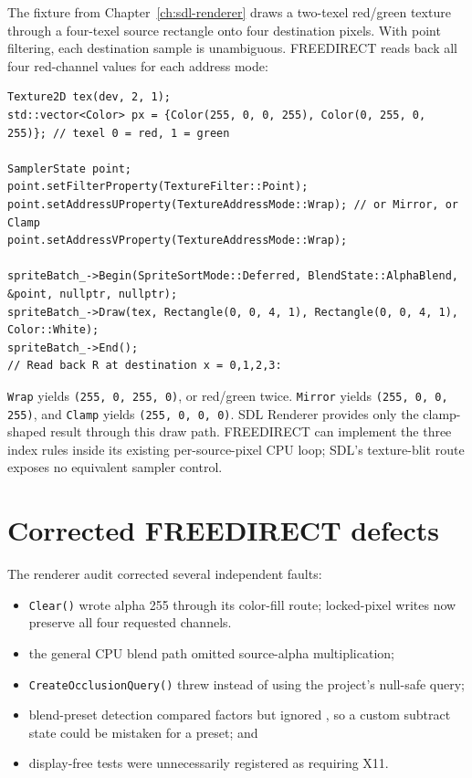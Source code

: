 The fixture from Chapter~\ref{ch:sdl-renderer} draws a two-texel red/green texture through a
four-texel source rectangle onto four destination pixels. With point filtering, each destination
sample is unambiguous. FREEDIRECT reads back all four red-channel values for each address mode:

\begin{lstlisting}
Texture2D tex(dev, 2, 1);
std::vector<Color> px = {Color(255, 0, 0, 255), Color(0, 255, 0, 255)}; // texel 0 = red, 1 = green

SamplerState point;
point.setFilterProperty(TextureFilter::Point);
point.setAddressUProperty(TextureAddressMode::Wrap); // or Mirror, or Clamp
point.setAddressVProperty(TextureAddressMode::Wrap);

spriteBatch_->Begin(SpriteSortMode::Deferred, BlendState::AlphaBlend, &point, nullptr, nullptr);
spriteBatch_->Draw(tex, Rectangle(0, 0, 4, 1), Rectangle(0, 0, 4, 1), Color::White);
spriteBatch_->End();
// Read back R at destination x = 0,1,2,3:
\end{lstlisting}

\texttt{Wrap} yields \texttt{(255, 0, 255, 0)}, or red/green twice. \texttt{Mirror} yields
\texttt{(255, 0, 0, 255)}, and \texttt{Clamp} yields \texttt{(255, 0, 0, 0)}. SDL Renderer
provides only the clamp-shaped result through this draw path. FREEDIRECT can implement the three
index rules inside its existing per-source-pixel CPU loop; SDL's texture-blit route exposes no
equivalent sampler control.

\section{Corrected FREEDIRECT defects}

The renderer audit corrected several independent faults:

\begin{itemize}
  \item \texttt{Clear()} wrote alpha 255 through its color-fill route; locked-pixel writes now
        preserve all four requested channels.
  \item the general CPU blend path omitted source-alpha multiplication;
  \item \texttt{CreateOcclusionQuery()} threw instead of using the project's null-safe query;
  \item blend-preset detection compared factors but ignored , so a
        custom subtract state could be mistaken for a preset; and
  \item display-free tests were unnecessarily registered as requiring X11.
\end{itemize}

